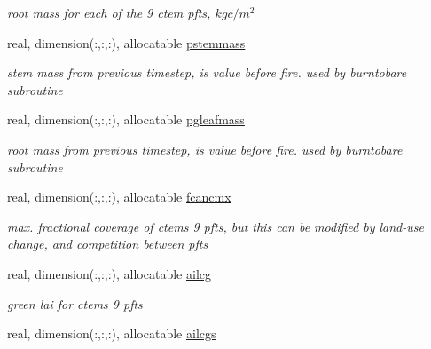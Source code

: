 \begin{DoxyCompactItemize}
\begin{DoxyCompactList}\small\item\em root mass for each of the 9 ctem pfts, $kg c/m^2$ \end{DoxyCompactList}\item 
\hypertarget{structctem__statevars_1_1veg__rot_a4393c7525d9bc6bd2f6ee0b715c66d3f}{}real, dimension(\+:,\+:,\+:), allocatable \hyperlink{structctem__statevars_1_1veg__rot_a4393c7525d9bc6bd2f6ee0b715c66d3f}{pstemmass}\label{structctem__statevars_1_1veg__rot_a4393c7525d9bc6bd2f6ee0b715c66d3f}

\begin{DoxyCompactList}\small\item\em stem mass from previous timestep, is value before fire. used by burntobare subroutine \end{DoxyCompactList}\item 
\hypertarget{structctem__statevars_1_1veg__rot_a40f5acf4a3bcb4402025a56acb347e24}{}real, dimension(\+:,\+:,\+:), allocatable \hyperlink{structctem__statevars_1_1veg__rot_a40f5acf4a3bcb4402025a56acb347e24}{pgleafmass}\label{structctem__statevars_1_1veg__rot_a40f5acf4a3bcb4402025a56acb347e24}

\begin{DoxyCompactList}\small\item\em root mass from previous timestep, is value before fire. used by burntobare subroutine \end{DoxyCompactList}\item 
\hypertarget{structctem__statevars_1_1veg__rot_af3af88553e06b2d5e795962bdae3f562}{}real, dimension(\+:,\+:,\+:), allocatable \hyperlink{structctem__statevars_1_1veg__rot_af3af88553e06b2d5e795962bdae3f562}{fcancmx}\label{structctem__statevars_1_1veg__rot_af3af88553e06b2d5e795962bdae3f562}

\begin{DoxyCompactList}\small\item\em max. fractional coverage of ctem\textquotesingle{}s 9 pfts, but this can be modified by land-\/use change, and competition between pfts \end{DoxyCompactList}\item 
\hypertarget{structctem__statevars_1_1veg__rot_a8fb517df0ba675cfa39177abfeb2ae4a}{}real, dimension(\+:,\+:,\+:), allocatable \hyperlink{structctem__statevars_1_1veg__rot_a8fb517df0ba675cfa39177abfeb2ae4a}{ailcg}\label{structctem__statevars_1_1veg__rot_a8fb517df0ba675cfa39177abfeb2ae4a}

\begin{DoxyCompactList}\small\item\em green lai for ctem\textquotesingle{}s 9 pfts \end{DoxyCompactList}\item 
\hypertarget{structctem__statevars_1_1veg__rot_a7b79ddfea3cbde4d809b5cdcb1f99370}{}real, dimension(\+:,\+:,\+:), allocatable \hyperlink{structctem__statevars_1_1veg__rot_a7b79ddfea3cbde4d809b5cdcb1f99370}{ailcgs}\label{structctem__statevars_1_1veg__rot_a7b79ddfea3cbde4d809b5cdcb1f99370}


\end{DoxyCompactItemize}
